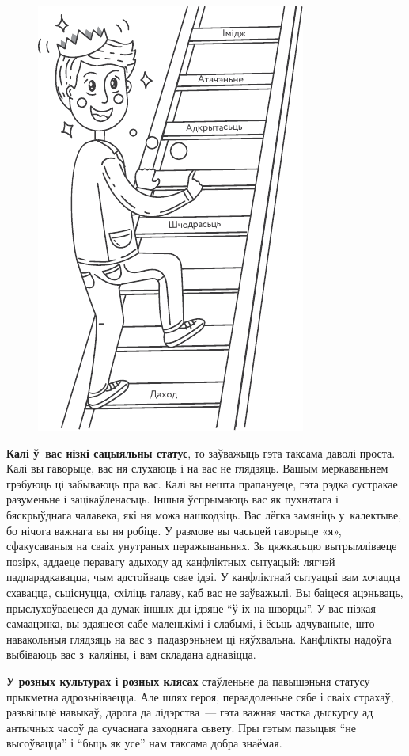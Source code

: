 \begin{figure}[htb!]
  \centering
  \includegraphics[scale=1.5]{willpower/ch9/1.pdf}
\end{figure}

\textbf{Калі ў~вас нізкі сацыяльны статус}, то заўважыць гэта таксама даволі проста. Калі вы гаворыце, вас ня слухаюць і на вас не глядзяць. Вашым меркаваньнем грэбуюць ці забываюць пра вас. Калі вы нешта прапануеце, гэта рэдка сустракае разуменьне і зацікаўленасьць. Іншыя ўспрымаюць вас як пухнатага і бяскрыўднага чалавека, які ня можа нашкодзіць. Вас лёгка замяніць у~калектыве, бо нічога важнага вы ня робіце. У размове вы часьцей гаворыце «я», сфакусаваныя на сваіх унутраных перажываньнях. Зь цяжкасьцю вытрымліваеце позірк, аддаеце перавагу адыходу ад канфліктных сытуацый: лягчэй падпарадкавацца, чым адстойваць свае ідэі. У канфліктнай сытуацыі вам хочацца схавацца, сьціснуцца, схіліць галаву, каб вас не заўважылі. Вы баіцеся ацэньваць, прыслухоўваецеся да думак іншых ды ідзяце ``ў іх на шворцы''. У вас нізкая самаацэнка, вы здаяцеся сабе маленькімі і слабымі, і ёсьць адчуваньне, што навакольныя глядзяць на вас з~падазрэньнем ці няўхвальна. Канфлікты надоўга выбіваюць вас з~каляіны, і вам складана аднавіцца.

\textbf{У розных культурах і розных клясах} стаўленьне да павышэньня статусу прыкметна адрозьніваецца. Але шлях героя, пераадоленьне сябе і сваіх страхаў, разьвіцьцё навыкаў, дарога да лідэрства~--- гэта важная частка дыскурсу ад антычных часоў да сучаснага заходняга сьвету. Пры гэтым пазыцыя ``не высоўвацца'' і ``быць як усе'' нам таксама добра знаёмая.

